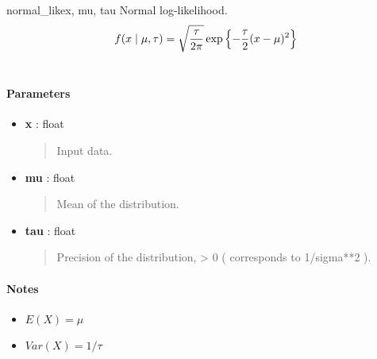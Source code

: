 \hypertarget{pymc.distributions.normal_like}{}\begin{funcdesc}{normal\_like}{x, mu, tau}
Normal log-likelihood.
\begin{gather}
\begin{split}f(x \mid \mu, \tau) = \sqrt{\frac{\tau}{2\pi}} \exp\left\{ -\frac{\tau}{2} (x-\mu)^2 \right\}\end{split}\notag\\\begin{split}\end{split}\notag
\end{gather}\paragraph{Parameters}\begin{itemize}

\item[] \textbf{x} : float
\begin{quote}

Input data.
\end{quote}

\item[] \textbf{mu} : float
\begin{quote}

Mean of the distribution.
\end{quote}

\item[] \textbf{tau} : float
\begin{quote}

Precision of the distribution, \textgreater{} 0 ( corresponds to 1/sigma**2 ).
\end{quote}
\end{itemize}
\paragraph{Notes}
\begin{itemize}
\item {} 
$E(X) = \mu$

\item {} 
$Var(X) = 1/\tau$

\end{itemize}
\end{funcdesc}

